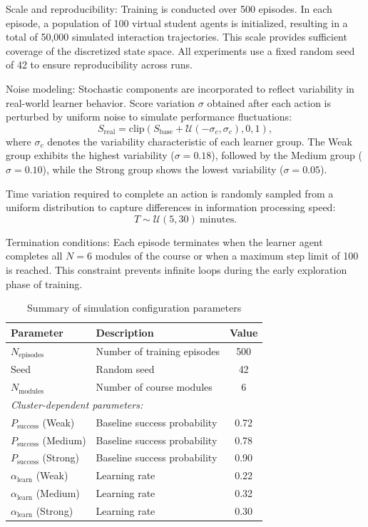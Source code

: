 \documentclass[conference]{IEEEtran}
\begin{document}
Scale and reproducibility: Training is conducted over 500 episodes. In each episode, a population of 100 virtual student agents is initialized, resulting in a total of 50{,}000 simulated interaction trajectories. This scale provides sufficient coverage of the discretized state space. All experiments use a fixed random seed of 42 to ensure reproducibility across runs.

Noise modeling: Stochastic components are incorporated to reflect variability in real-world learner behavior. Score variation $\sigma$ obtained after each action is perturbed by uniform noise to simulate performance fluctuations:
\begin{equation}
S_{\text{real}} = \text{clip}\left(S_{\text{base}} + \mathcal{U}(-\sigma_c, \sigma_c), 0, 1\right),
\end{equation}
where $\sigma_c$ denotes the variability characteristic of each learner group. The Weak group exhibits the highest variability ($\sigma = 0.18$), followed by the Medium group ($\sigma = 0.10$), while the Strong group shows the lowest variability ($\sigma = 0.05$).

Time variation required to complete an action is randomly sampled from a uniform distribution to capture differences in information processing speed:
\begin{equation}
T \sim \mathcal{U}(5, 30) \ \text{minutes}.
\end{equation}


Termination conditions: Each episode terminates when the learner agent completes all $N = 6$ modules of the course or when a maximum step limit of 100 is reached. This constraint prevents infinite loops during the early exploration phase of training.

\begin{table}[htbp]
\caption{Summary of simulation configuration parameters}
\label{tab:sim_params}
\begin{center}
\begin{tabular}{lp{4.5cm}c}
\toprule
\textbf{Parameter} & \textbf{Description} & \textbf{Value} \\
\midrule
$N_{\text{episodes}}$ & Number of training episodes & 500 \\
Seed & Random seed & 42 \\
$N_{\text{modules}}$ & Number of course modules & 6 \\
\midrule
\multicolumn{3}{l}{\textit{Cluster-dependent parameters:}} \\
$P_{\text{success}}$ (Weak) & Baseline success probability & 0.72 \\
$P_{\text{success}}$ (Medium) & Baseline success probability & 0.78 \\
$P_{\text{success}}$ (Strong) & Baseline success probability & 0.90 \\
$\alpha_{\text{learn}}$ (Weak) & Learning rate & 0.22 \\
$\alpha_{\text{learn}}$ (Medium) & Learning rate & 0.32 \\
$\alpha_{\text{learn}}$ (Strong) & Learning rate & 0.30 \\
\bottomrule
\end{tabular}
\end{center}
\end{table}
\end{document}
